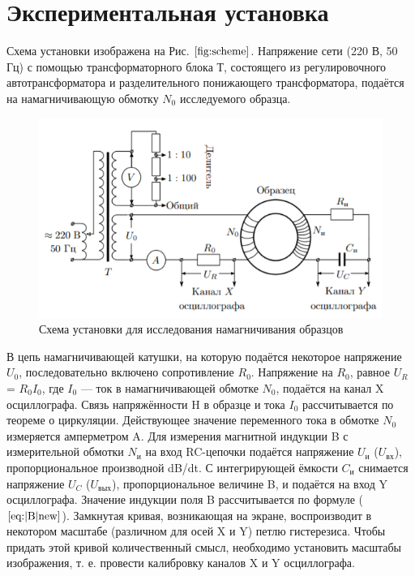 \section{Экспериментальная установка}
Схема установки изображена на Рис. $\ref{fig:scheme}$. Напряжение сети (220 В,
50 Гц) с помощью трансформаторного блока Т, состоящего из регулировочного автотрансформатора и разделительного понижающего трансформатора, подаётся на намагничивающую обмотку $N_0$ исследуемого образца.
\begin{figure}[h!]
    \centering
    \includegraphics{scheme.png}
    \caption{ Схема установки для исследования намагничивания образцов}
    \label{fig:scheme}
\end{figure}

В цепь намагничивающей катушки, на которую подаётся некоторое
напряжение $U_0$, последовательно включено сопротивление $R_0$. Напряжение на $R_0$, равное $U_R$= $R_0I_0$, где $I_0$ — ток в намагничивающей обмотке $N_0$, подаётся на канал X осциллографа. Связь напряжённости H в
образце и тока $I_0$ рассчитывается по теореме о циркуляции. 
Действующее значение переменного тока в обмотке $N_0$ измеряется амперметром A.
Для измерения магнитной индукции B с измерительной обмотки $N_и$
на вход RC-цепочки подаётся напряжение $U_и$ ($U_{вх}$), пропорциональное
производной dB/dt. С интегрирующей ёмкости $C_и$ снимается напряжение $U_C$ ($U_{вых}$), пропорциональное величине B, и подаётся на вход Y
осциллографа. Значение индукции поля B рассчитывается по формуле ($\ref{eq:|B|new}$).
Замкнутая кривая, возникающая на экране, воспроизводит в некотором масштабе (различном для осей X и Y) петлю гистерезиса. Чтобы придать этой кривой количественный смысл, необходимо установить
масштабы изображения, т. е. провести калибровку каналов X и Y осциллографа.

